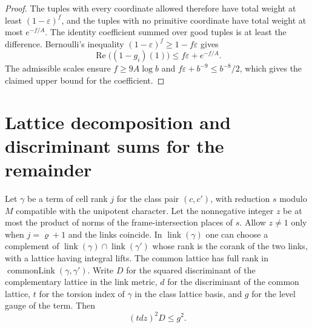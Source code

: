 \begin{proof}
The tuples with every coordinate allowed therefore have total weight at least $(1-\varepsilon)^f$,
and the tuples with no primitive coordinate have total weight at most $e^{-f/A}$.
The identity coefficient summed over good tuples is at least the difference.
Bernoulli's inequality $(1-\varepsilon)^f\ge1-f\varepsilon$ gives
\[
 \operatorname{Re}\bigl((1-g_i)(1)\bigr)\le f\varepsilon+e^{-f/A}.
\]
The admissible scales ensure $f\ge9A\log b$ and
$f\varepsilon+b^{-9}\le b^{-8}/2$, which gives the claimed upper bound for the coefficient.
\end{proof}

\section{Lattice decomposition and discriminant sums for the remainder}
\label{sec:b-remainder}

\begin{lemma}
\label{lem:b-link-splitting}
\emitthmsource
Let $\gamma$ be a term of cell rank $j$ for the class pair $(c,c')$, with reduction $s$ modulo $M$ compatible with the unipotent character.
Let the nonnegative integer $z$ be at most the product of norms of the frame-intersection places of $s$. Allow $z\ne1$ only when $j=\varrho+1$ and the links coincide.
In $\operatorname{link}(\gamma)$ one can choose a complement of $\operatorname{link}(\gamma)\cap\operatorname{link}(\gamma')$ whose rank is the corank of the two links, with a lattice having integral lifts. The common lattice has full rank in $\operatorname{commonLink}(\gamma,\gamma')$. Write $D$ for the squared discriminant of the complementary lattice in the link metric, $d$ for the discriminant of the common lattice, $t$ for the torsion index of $\gamma$ in the class lattice basis, and $g$ for the level gauge of the term. Then
\[
 (tdz)^2D\le g^2.
\]
\end{lemma}

